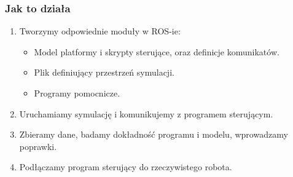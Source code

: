\documentclass{beamer}
\begin{document}
	\begin{frame}
		\frametitle{Jak to działa}
		\begin{enumerate}
			\item Tworzymy odpowiednie moduły w ROS-ie:
			\begin{itemize}
			 \item Model platformy i skrypty sterujące, oraz definicje komunikatów.
			 \item Plik definiujący przestrzeń symulacji.
			 \item Programy pomocnicze.
			\end{itemize}
			\item Uruchamiamy symulację i komunikujemy z programem sterującym.
			\item Zbieramy dane, badamy dokładność programu i modelu, wprowadzamy poprawki.
			\item Podłączamy program sterujący do rzeczywistego robota.
		\end{enumerate}
	\end{frame}
	
\end{document}
